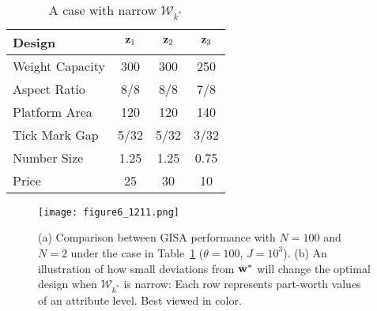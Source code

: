 \documentclass[onecolumn,11pt]{article}
\newcommand{\cutsubsectionup}{\vspace*{-0.09in}}
\newcommand{\cutsubsectionup}{}
\begin{document}
\begin{table}[ht!]
\centering
\caption{A case with narrow $\mathcal{W}_{k^*}$}
\label{tb:narrowcase}
\begin{tabular}{ l | c c c }
\hline 
Design & ${\bf z}_1$ & ${\bf z}_2$ & ${\bf z}_3$ \\
\hline
Weight Capacity & 300 & 300 & 250 \\
Aspect Ratio & 8/8 & 8/8 & 7/8 \\
Platform Area & 120 & 120 & 140 \\
Tick Mark Gap & 5/32 & 5/32 & 3/32 \\
Number Size & 1.25 & 1.25 & 0.75 \\
Price & 25 & 30 & 10 \\
\hline
\end{tabular}
\end{table}
\begin{figure}
\centering
\texttt{[image: figure6\_1211.png]}
\caption{(a) Comparison between GISA performance with $N=100$ and $N=2$ under the case in Table~\ref{tb:narrowcase} ($\theta=100$, $J=10^3$). (b) An illustration of how small deviations from ${\bf w}^*$ will change the optimal design when $\mathcal{W}_{k^*}$ is narrow: Each row represents part-worth values of an attribute level. Best viewed in color.}
\label{fig:figure6}
\end{figure}

\cutsubsectionup
\end{document}
